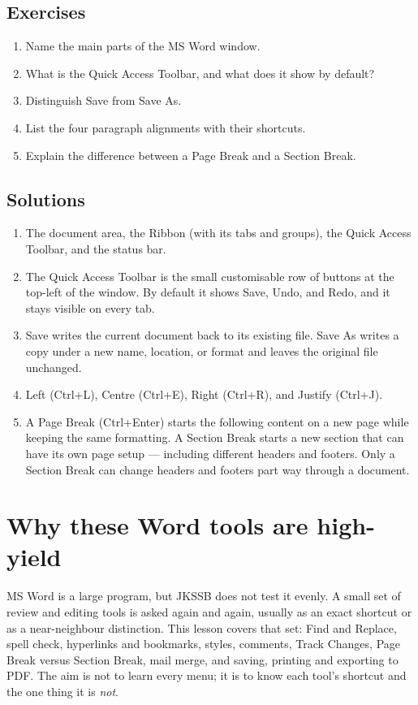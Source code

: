 \subsection*{Exercises}
\begin{enumerate}[label=\arabic*.]
  \item Name the main parts of the MS Word window.
  \item What is the Quick Access Toolbar, and what does it show by default?
  \item Distinguish Save from Save As.
  \item List the four paragraph alignments with their shortcuts.
  \item Explain the difference between a Page Break and a Section Break.
\end{enumerate}

\subsection*{Solutions}
\begingroup\small
\begin{enumerate}[label=\arabic*.]
  \item The document area, the Ribbon (with its tabs and groups), the Quick
    Access Toolbar, and the status bar.
  \item The Quick Access Toolbar is the small customisable row of buttons at
    the top-left of the window. By default it shows Save, Undo, and Redo,
    and it stays visible on every tab.
  \item Save writes the current document back to its existing file. Save As
    writes a copy under a new name, location, or format and leaves the
    original file unchanged.
  \item Left (Ctrl+L), Centre (Ctrl+E), Right (Ctrl+R), and Justify
    (Ctrl+J).
  \item A Page Break (Ctrl+Enter) starts the following content on a new page
    while keeping the same formatting. A Section Break starts a new section
    that can have its own page setup --- including different headers and
    footers. Only a Section Break can change headers and footers part way
    through a document.
\end{enumerate}
\endgroup

\section{Why these Word tools are high-yield}
MS Word is a large program, but JKSSB does not test it evenly. A small set of
review and editing tools is asked again and again, usually as an exact shortcut
or as a near-neighbour distinction. This lesson covers that set: Find and
Replace, spell check, hyperlinks and bookmarks, styles, comments, Track Changes,
Page Break versus Section Break, mail merge, and saving, printing and exporting
to PDF. The aim is not to learn every menu; it is to know each tool's shortcut
and the one thing it is \emph{not}.

